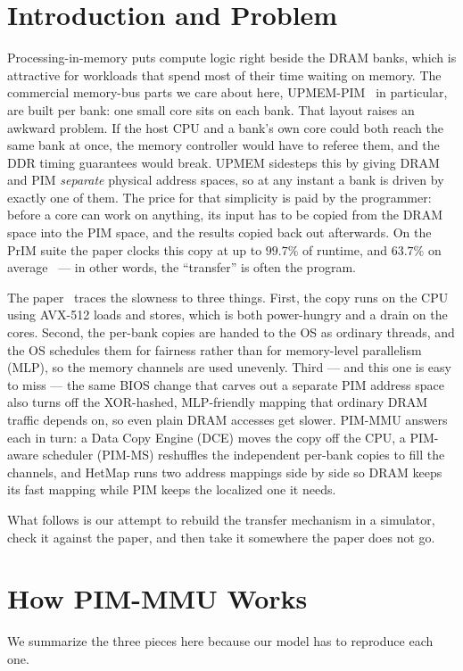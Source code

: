 \documentclass[conference]{IEEEtran}
\begin{document}
\section{Introduction and Problem}
Processing-in-memory puts compute logic right beside the DRAM banks, which is
attractive for workloads that spend most of their time waiting on memory. The
commercial memory-bus parts we care about here, UPMEM-PIM~\cite{upmem} in
particular, are built per bank: one small core sits on each bank. That layout
raises an awkward problem. If the host CPU and a bank's own core could both
reach the same bank at once, the memory controller would have to referee them,
and the DDR timing guarantees would break. UPMEM sidesteps this by giving DRAM
and PIM \emph{separate} physical address spaces, so at any instant a bank is
driven by exactly one of them. The price for that simplicity is paid by the
programmer: before a core can work on anything, its input has to be copied from
the DRAM space into the PIM space, and the results copied back out afterwards.
On the PrIM suite the paper clocks this copy at up to $99.7\%$ of runtime, and
$63.7\%$ on average~\cite{prim} --- in other words, the ``transfer'' is often the
program.

The paper~\cite{pimmmu} traces the slowness to three things. First, the copy
runs on the CPU using AVX-512 loads and stores, which is both power-hungry and a
drain on the cores. Second, the per-bank copies are handed to the OS as ordinary
threads, and the OS schedules them for fairness rather than for memory-level
parallelism (MLP), so the memory channels are used unevenly. Third --- and this
one is easy to miss --- the same BIOS change that carves out a separate PIM
address space also turns off the XOR-hashed, MLP-friendly mapping that ordinary
DRAM traffic depends on, so even plain DRAM accesses get slower. PIM-MMU answers
each in turn: a Data Copy Engine (DCE) moves the copy off the CPU, a PIM-aware
scheduler (PIM-MS) reshuffles the independent per-bank copies to fill the
channels, and HetMap runs two address mappings side by side so DRAM keeps its
fast mapping while PIM keeps the localized one it needs.

What follows is our attempt to rebuild the transfer mechanism in a simulator,
check it against the paper, and then take it somewhere the paper does not go.

\section{How PIM-MMU Works}
We summarize the three pieces here because our model has to reproduce each one.
\end{document}
